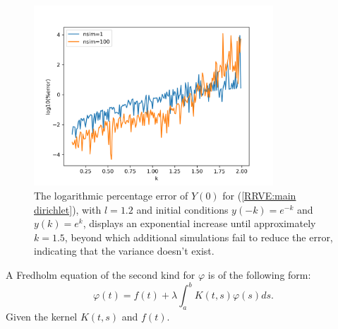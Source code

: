 \documentclass[a4paper,12pt]{article}
\begin{document}
\begin{figure}[h!]
    \centering
    \includegraphics[width=0.8\textwidth]{plots/mainD explosion.png}
    \caption{The logarithmic percentage error of $Y(0)$ for
    (\ref{RRVE:main dirichlet}), with $l=1.2$ and initial conditions
    $y(-k)=e^{-k}$ and $y(k)=e^{k}$, displays an exponential
    increase until approximately $k=1.5$, beyond which additional
    simulations fail to reduce the error, indicating that the variance
    doesn't exist.}
    \label{fig:mainD explosion}
\end{figure}

\begin{definition}
    A Fredholm equation of the second kind for $\varphi$  is of the following form:
    \begin{equation}
        \varphi(t)=f(t)+\lambda \int_a^b K(t, s) \varphi(s) ds.
    \end{equation}
    Given the kernel  $K(t, s)$  and  $ f(t)$.
\end{definition}



\end{document}
